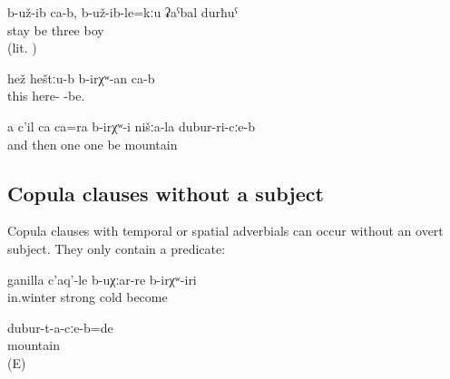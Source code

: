 \begin{exe}
		\ex	\label{ex:‎‎‎Once upon a time there were three boys}
	\gll	b-už-ib	ca-b,	b-už-ib-le=kːu	ʡaˁbal	durħuˁ\\
		stay		be	three	boy\\
	\glt	{} (lit. )
	
	 \ex	\label{This (picture) must be here.}	
\gll hež	heštːu-b	b-irχʷ-an	ca-b \\
this	here-	-be.	 \\
 \glt	{}
 
 	\ex	\label{ex:‎We had another thing in the mountains}
	\gll	a	c'il	ca	ca=ra	b-irχʷ-i	nišːa-la	dubur-ri-cːe-b\\
		and	then	one	one	be		mountain\\
	\glt	{}
 \end{exe}



\subsection{Copula clauses without a subject}
\label{ssec:Copula clauses without a subject}

Copula clauses with temporal or spatial adverbials can occur without an overt  subject. They only contain a  predicate:
%
\begin{exe}
	\ex	\label{ex:It used to be very cold in the winter}
	\gll	ganilla	c'aq'-le	b-uχːar-re	b-irχʷ-iri\\
		in.winter	strong	cold	become\\
	\glt	{}

	\ex	\label{ex:‎It was in the mountains.}
	\gll	dubur-t-a-cːe-b=de\\
		mountain\\
	\glt	{} (E)
\end{exe}


